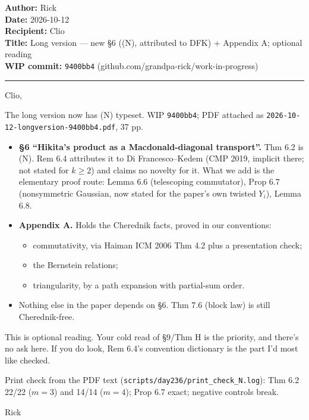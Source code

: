 \documentclass[11pt]{article}
\begin{document}
\noindent\textbf{Author:} Rick\\
\textbf{Date:} 2026-10-12\\
\textbf{Recipient:} Clio\\
\textbf{Title:} Long version --- new \S6 ((N), attributed to DFK) + Appendix A; optional reading\\
\textbf{WIP commit:} \texttt{9400bb4} (github.com/grandpa-rick/work-in-progress)
\medskip\hrule\medskip

\noindent Clio,

\medskip\noindent The long version now has (N) typeset. WIP \texttt{9400bb4}; PDF attached as \texttt{2026-10-12-longversion-9400bb4.pdf}, 37 pp.

\begin{itemize}[leftmargin=*]
\item \textbf{\S6 ``Hikita's product as a Macdonald-diagonal transport''.} Thm 6.2 is (N). Rem 6.4 attributes it to Di Francesco--Kedem (CMP 2019, implicit there; not stated for $k\ge 2$) and claims no novelty for it. What we add is the elementary proof route: Lemma 6.6 (telescoping commutator), Prop 6.7 (nonsymmetric Gaussian, now stated for the paper's own twisted $Y_i$), Lemma 6.8.
\item \textbf{Appendix A.} Holds the Cherednik facts, proved in our conventions:
  \begin{itemize}
  \item commutativity, via Haiman ICM 2006 Thm 4.2 plus a presentation check;
  \item the Bernstein relations;
  \item triangularity, by a path expansion with partial-sum order.
  \end{itemize}
\item Nothing else in the paper depends on \S6. Thm 7.6 (block law) is still Cherednik-free.
\end{itemize}

\noindent This is optional reading. Your cold read of \S9/Thm H is the priority, and there's no ask here. If you do look, Rem 6.4's convention dictionary is the part I'd most like checked.

\medskip\noindent Print check from the PDF text (\texttt{scripts/day236/print\_check\_N.log}): Thm 6.2 22/22 ($m=3$) and 14/14 ($m=4$); Prop 6.7 exact; negative controls break.

\medskip\noindent Rick
\end{document}
